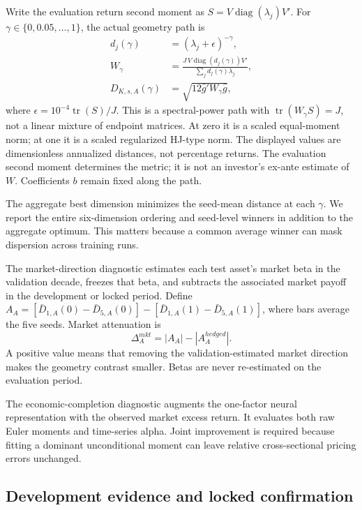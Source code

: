 Write the evaluation return second moment as $S=V\operatorname{diag}(\lambda_j)V'$. For $\gamma\in\{0,0.05,\ldots,1\}$, the actual geometry path is
\begin{align}
 d_j(\gamma)&=(\lambda_j+\epsilon)^{-\gamma},\\
 W_\gamma&=\frac{J\,V\operatorname{diag}(d_j(\gamma))V'}{\sum_jd_j(\gamma)\lambda_j},\\
 D_{K,s,A}(\gamma)&=\sqrt{12\hat g'W_\gamma\hat g},
\end{align}
where $\epsilon=10^{-4}\operatorname{tr}(S)/J$. This is a spectral-power path with $\operatorname{tr}(W_\gamma S)=J$, not a linear mixture of endpoint matrices. At zero it is a scaled equal-moment norm; at one it is a scaled regularized HJ-type norm. The displayed values are dimensionless annualized distances, not percentage returns. The evaluation second moment determines the metric; it is not an investor's ex-ante estimate of $W$. Coefficients $b$ remain fixed along the path.

The aggregate best dimension minimizes the seed-mean distance at each $\gamma$. We report the entire six-dimension ordering and seed-level winners in addition to the aggregate optimum. This matters because a common average winner can mask dispersion across training runs.

The market-direction diagnostic estimates each test asset's market beta in the validation decade, freezes that beta, and subtracts the associated market payoff in the development or locked period. Define $A_A=[\bar D_{1,A}(0)-\bar D_{5,A}(0)]-[\bar D_{1,A}(1)-\bar D_{5,A}(1)]$, where bars average the five seeds. Market attenuation is
\begin{equation}
 \Delta_A^{mkt}=|A_A|-|A_A^{hedged}|.
\end{equation}
A positive value means that removing the validation-estimated market direction makes the geometry contrast smaller. Betas are never re-estimated on the evaluation period.

The economic-completion diagnostic augments the one-factor neural representation with the observed market excess return. It evaluates both raw Euler moments and time-series alpha. Joint improvement is required because fitting a dominant unconditional moment can leave relative cross-sectional pricing errors unchanged.

\subsection{Development evidence and locked confirmation}

